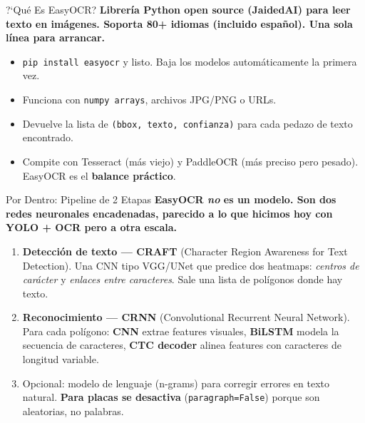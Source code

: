 \documentclass[aspectratio=169, 11pt]{beamer}
\begin{document}
\begin{frame}[shrink]{?`Qu\'e Es EasyOCR?}
  \vspace{6pt}
  {\footnotesize\color{arcaDark}\bfseries
    Librer\'ia Python open source (JaidedAI) para leer texto en
    im\'agenes. Soporta \textbf{80+ idiomas} (incluido espa\~nol).
    Una sola l\'inea para arrancar.}

  \vspace{14pt}
  {\footnotesize
  \begin{itemize}\setlength{\itemsep}{6pt}
    \item[{\color{arcaRed}\scriptsize\faArrowRight}]
      \texttt{pip install easyocr} y listo. Baja los modelos
      autom\'aticamente la primera vez.
    \item[{\color{arcaRed}\scriptsize\faArrowRight}]
      Funciona con \texttt{numpy arrays}, archivos JPG/PNG o URLs.
    \item[{\color{arcaRed}\scriptsize\faArrowRight}]
      Devuelve la lista de \texttt{(bbox, texto, confianza)} para cada
      pedazo de texto encontrado.
    \item[{\color{codeGreen}\scriptsize\faArrowRight}]
      Compite con Tesseract (m\'as viejo) y PaddleOCR (m\'as preciso
      pero pesado). EasyOCR es el \textbf{balance pr\'actico}.
  \end{itemize}
  }
\end{frame}

\begin{frame}[shrink]{Por Dentro: Pipeline de 2 Etapas}
  \vspace{6pt}
  {\footnotesize\color{arcaDark}\bfseries
    EasyOCR \emph{no} es un modelo. Son \textbf{dos redes neuronales
    encadenadas}, parecido a lo que hicimos hoy con YOLO + OCR pero a
    otra escala.}

  \vspace{14pt}
  {\footnotesize
  \begin{enumerate}\setlength{\itemsep}{8pt}
    \item[{\color{arcaRed}\bfseries 1.}]
      \textbf{Detecci\'on de texto --- CRAFT} (Character Region Awareness for
      Text Detection). Una CNN tipo VGG/UNet que predice dos heatmaps:
      \emph{centros de car\'acter} y \emph{enlaces entre caracteres}.
      Sale una lista de pol\'igonos donde hay texto.
    \item[{\color{arcaRed}\bfseries 2.}]
      \textbf{Reconocimiento --- CRNN} (Convolutional Recurrent Neural Network).
      Para cada pol\'igono: \textbf{CNN} extrae features visuales,
      \textbf{BiLSTM} modela la secuencia de caracteres,
      \textbf{CTC decoder} alinea features con caracteres de longitud variable.
    \item[{\color{codeGreen}\bfseries 3.}]
      Opcional: modelo de lenguaje (n-grams) para corregir errores
      en texto natural. \textbf{Para placas se desactiva}
      (\texttt{paragraph=False}) porque son aleatorias, no palabras.
  \end{enumerate}
  }
\end{frame}
\end{document}
